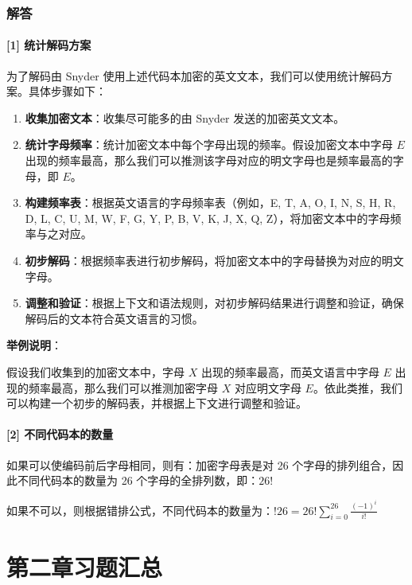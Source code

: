 \documentclass[UTF8]{report}
\theoremstyle{MyLineTheoremStyle} %
\theoremstyle{MyBlockTheoremStyle} %
\theoremstyle{MySubsubsectionStyle} %
\begin{document}
\subsection*{解答}

\subsubsection*{[1] 统计解码方案}

为了解码由 Snyder 使用上述代码本加密的英文文本，我们可以使用统计解码方案。具体步骤如下：

\begin{enumerate}
    \item \textbf{收集加密文本}：收集尽可能多的由 Snyder 发送的加密英文文本。
    \item \textbf{统计字母频率}：统计加密文本中每个字母出现的频率。假设加密文本中字母 \(E\) 出现的频率最高，那么我们可以推测该字母对应的明文字母也是频率最高的字母，即 \(E\)。
    \item \textbf{构建频率表}：根据英文语言的字母频率表（例如，E, T, A, O, I, N, S, H, R, D, L, C, U, M, W, F, G, Y, P, B, V, K, J, X, Q, Z），将加密文本中的字母频率与之对应。
    \item \textbf{初步解码}：根据频率表进行初步解码，将加密文本中的字母替换为对应的明文字母。
    \item \textbf{调整和验证}：根据上下文和语法规则，对初步解码结果进行调整和验证，确保解码后的文本符合英文语言的习惯。
\end{enumerate}

\textbf{举例说明}：

假设我们收集到的加密文本中，字母 \(X\) 出现的频率最高，而英文语言中字母 \(E\) 出现的频率最高，那么我们可以推测加密字母 \(X\) 对应明文字母 \(E\)。依此类推，我们可以构建一个初步的解码表，并根据上下文进行调整和验证。

\subsubsection*{[2] 不同代码本的数量}
如果可以使编码前后字母相同，则有：加密字母表是对 26 个字母的排列组合，因此不同代码本的数量为 26 个字母的全排列数，即：$26!$\par
如果不可以，则根据错排公式，不同代码本的数量为：$!26 = 26! \sum_{i=0}^{26} \frac{(-1)^i}{i!}$








\chapter{第二章习题汇总}\thispagestyle{fancy}
\end{document}
